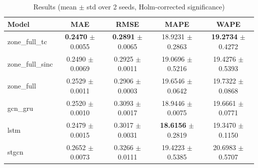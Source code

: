\begin{table}[H]
\centering
\caption{Results (mean $\pm$ std over 2 seeds, Holm-corrected significance)}
\label{tab:results-chrono}
\begin{tabular}{lcccc}
\toprule
Model & MAE & RMSE & MAPE & WAPE \\
\midrule
zone\_full\_tc & \textbf{0.2470} $\pm$ 0.0055 & \textbf{0.2891} $\pm$ 0.0065 & 18.9231 $\pm$ 0.2863 & \textbf{19.2734} $\pm$ 0.4272 \\
zone\_full\_sinc & 0.2490 $\pm$ 0.0069 & 0.2925 $\pm$ 0.0011 & 19.0696 $\pm$ 0.5216 & 19.4276 $\pm$ 0.5393 \\
zone\_full & 0.2529 $\pm$ 0.0011 & 0.2906 $\pm$ 0.0003 & 19.6546 $\pm$ 0.0642 & 19.7322 $\pm$ 0.0868 \\
gcn\_gru & 0.2520 $\pm$ 0.0010 & 0.3093 $\pm$ 0.0017 & 18.9446 $\pm$ 0.0075 & 19.6661 $\pm$ 0.0771 \\
lstm & 0.2479 $\pm$ 0.0015 & 0.3017 $\pm$ 0.0031 & \textbf{18.6156} $\pm$ 0.2819 & 19.3470 $\pm$ 0.1150 \\
stgcn & 0.2652 $\pm$ 0.0073 & 0.3266 $\pm$ 0.0111 & 19.4223 $\pm$ 0.5385 & 20.6983 $\pm$ 0.5707 \\
\bottomrule
\end{tabular}
\end{table}
